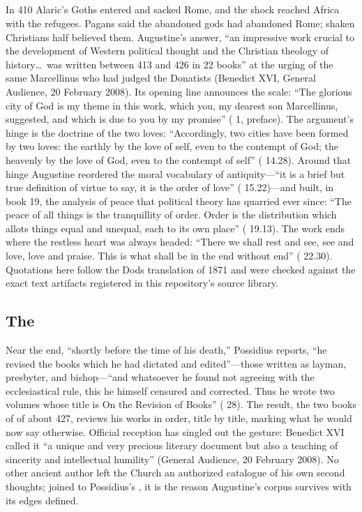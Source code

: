 \subsection{}

In 410 Alaric's Goths entered and sacked Rome, and the shock reached Africa
with the refugees. Pagans said the abandoned gods had abandoned Rome;
shaken Christians half believed them. Augustine's answer, ``an impressive
work crucial to the development of Western political thought and the
Christian theology of history\ldots\ was written between 413 and 426 in 22
books'' at the urging of the same Marcellinus who had judged the Donatists
(Benedict XVI, General Audience, 20 February 2008). Its opening line
announces the scale: ``The glorious city of God is my theme in this work,
which you, my dearest son Marcellinus, suggested, and which is due to you by
my promise'' ( 1, preface). The argument's hinge is the
doctrine of the two loves: ``Accordingly, two cities have been formed by two
loves: the earthly by the love of self, even to the contempt of God; the
heavenly by the love of God, even to the contempt of self'' ( 14.28). Around that hinge Augustine reordered the moral vocabulary of
antiquity---``it is a brief but true definition of virtue to say, it is the
order of love'' ( 15.22)---and built, in book 19, the
analysis of peace that political theory has quarried ever since: ``The peace
of all things is the tranquillity of order. Order is the distribution which
allots things equal and unequal, each to its own place'' (
19.13). The work ends where the restless heart was always headed: ``There we
shall rest and see, see and love, love and praise. This is what shall be in
the end without end'' ( 22.30). Quotations here follow the
Dods translation of 1871 and were checked against the exact text artifacts
registered in this repository's source library.

\subsection{The }

Near the end, ``shortly before the time of his death,'' Possidius reports,
``he revised the books which he had dictated and edited''---those written
as layman, presbyter, and bishop---``and whatsoever he found not agreeing
with the ecclesiastical rule, this he himself censured and corrected. Thus
he wrote two volumes whose title is On the Revision of Books''
( 28). The result, the two books of
 of about 427, reviews his works in order,
title by title, marking what he would now say otherwise. Official reception
has singled out the gesture: Benedict XVI called it ``a unique and very
precious literary document but also a teaching of sincerity and
intellectual humility'' (General Audience, 20 February 2008). No other
ancient author left the Church an authorized catalogue of his own
second thoughts; joined to Possidius's , it is the reason
Augustine's corpus survives with its edges defined.
